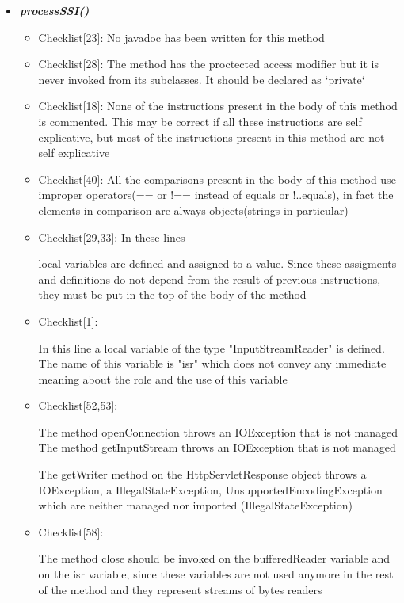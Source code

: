 \documentclass[11pt,titlepage]{article} %
\begin{document}
\begin{itemize}
   \item \textbf{\textit{processSSI()}}
    \begin{itemize}
     \item Checklist[23]: No javadoc has been written for this method
     \item Checklist[28]: The method has the proctected access modifier but it is never invoked from its subclasses. \newline It should be declared as `private`
     \item Checklist[18]: None of the instructions present in the body of this method is commented. This may be
      correct if all these instructions are self explicative, but most of the instructions
      present in this method are not self explicative
     \item Checklist[40]: All the comparisons present in the body of this method use improper
      operators(== or !== instead of equals or !..equals), in fact the elements in comparison
      are always objects(strings in particular)
     \item Checklist[29,33]: In these lines
      
      
      local variables are defined and assigned to a value. Since these assigments and definitions
      do not depend from the result of previous instructions, they must be put in the top
      of the body of the method
     \item Checklist[1]:
      
      In this line a local variable of the type "InputStreamReader" is defined. The name of
      this variable is "isr" which does not convey any immediate meaning about the role and the
      use of this variable
     \item Checklist[52,53]:
      
      The method openConnection throws an IOException that is not managed\newline
      The method getInputStream throws an IOException that is not managed\newline\newline
      
      
      The getWriter method on the HttpServletResponse object throws a IOException, a IllegalStateException, UnsupportedEncodingException
      which are neither managed nor imported (IllegalStateException)
     \item Checklist[58]:
      
      The method close should be invoked on the bufferedReader variable and on the
      isr variable, since these variables are not used anymore in the rest of the method
      and they represent streams of bytes readers
    \end{itemize}


\end{itemize}
\end{document}
